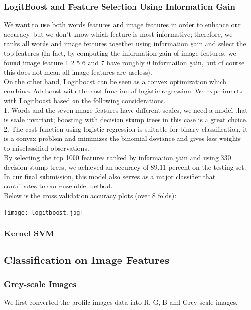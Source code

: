 \subsubsection{LogitBoost and Feature Selection Using Information Gain}
 We want to use both words features and image features in order to enhance our accuracy, but we don't know which feature is most informative; therefore, we ranks all words and image features together using information gain and select the top features (In fact, by computing the information gain of image features, we found image feature 1 2 5 6 and 7 have roughly 0 information gain, but of course this does not mean all image features are useless).\\
On the other hand, Logitboost can be seen as a convex optimization which combines Adaboost with the cost function of logistic regression. We experiments with Logitboost based on the following considerations.\\
1. Words and the seven image features have different scales, we need a model that is scale invariant; boosting with decision stump trees in this case is a great choice.\\
2. The cost function using logistic regression is suitable for binary classification, it is a convex problem and minimizes the binomial deviance and gives less weights to misclassified observations.\\
By selecting the top 1000 features ranked by information gain and using 330 decision stump trees, we achieved an accuracy of 89.11 percent on the testing set.\\
In our final submission, this model also serves as a major classifier that contributes to our ensemble method.\\
Below is the cross validation accuracy plots (over 8 folds):\\
\begin{center}
\texttt{[image: logitboost.jpg]}
\end{center}
\subsubsection{Kernel SVM}
\subsection{Classification on Image Features}
\subsubsection{Grey-scale Images}
We first converted the profile images data into R, G, B and Grey-scale images. 
